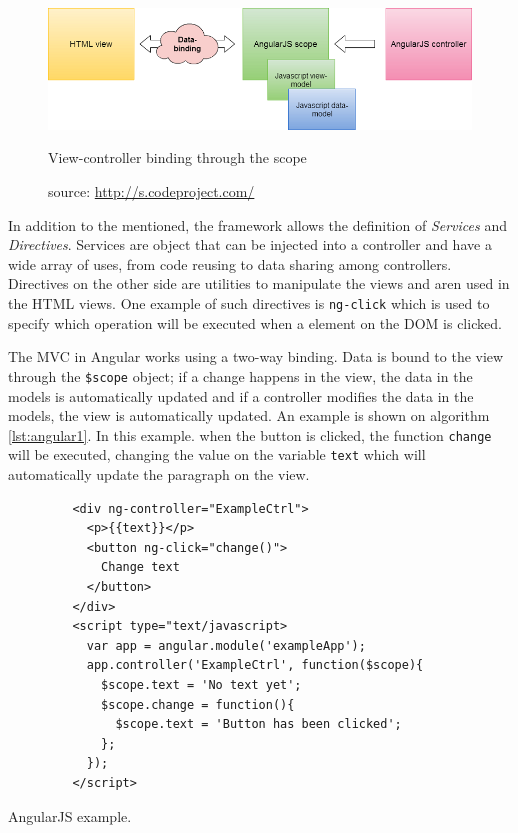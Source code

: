 \begin{figure}
  \centering
  \includegraphics[width=.8\textwidth]{fig/angular-scope}
  \caption{View-controller binding through the scope}
  \caption*{source: \url{http://s.codeproject.com/}}
  \label{fig:angularscope}
\end{figure} 

In addition to the mentioned, the framework allows the definition of \textit{Services} and \textit{Directives}. Services are object that can be injected into a controller and have a wide array of uses, from code reusing to data sharing among controllers. Directives on the other side are utilities to manipulate the views and aren  used in the HTML views. One example of such directives is \texttt{ng-click} which is used to specify which operation will be executed when a element on the DOM is clicked.

The MVC in Angular works using a two-way binding. Data is bound to the view through the \texttt{\$scope} object; if a change happens in the view, the data in the models is automatically updated and if a controller modifies the data in the models, the view is automatically updated. An example is shown on algorithm \ref{lst:angular1}. In this example. when the button is clicked, the function \texttt{change} will be executed, changing the value on the variable \texttt{text} which will automatically update the paragraph on the view.

\begin{listing}\centering
  \begin{minipage}{.6\textwidth}
    \begin{verbatim}
	     <div ng-controller="ExampleCtrl">
	       <p>{{text}}</p>
	       <button ng-click="change()"> 
	         Change text 
	       </button>
	     </div>
	     <script type="text/javascript>
	       var app = angular.module('exampleApp');
	       app.controller('ExampleCtrl', function($scope){
	         $scope.text = 'No text yet';
	         $scope.change = function(){
	           $scope.text = 'Button has been clicked';
	         };
	       });
	     </script>
    \end{verbatim}
  \end{minipage}
  \caption{AngularJS example.}\label{lst:angular1}
\end{listing}

